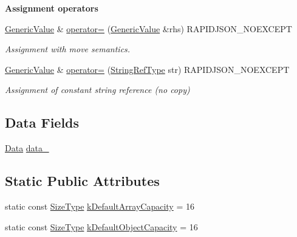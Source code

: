 \begin{Indent}\textbf{ Assignment operators}\par
\begin{DoxyCompactItemize}
\item 
\mbox{\hyperlink{classrapidjson_1_1_generic_value}{Generic\+Value}} \& \mbox{\hyperlink{classrapidjson_1_1_generic_value_ae8bcedd951f50b69786aaaa1828e9fac}{operator=}} (\mbox{\hyperlink{classrapidjson_1_1_generic_value}{Generic\+Value}} \&rhs) R\+A\+P\+I\+D\+J\+S\+O\+N\+\_\+\+N\+O\+E\+X\+C\+E\+PT
\begin{DoxyCompactList}\small\item\em Assignment with move semantics. \end{DoxyCompactList}\item 
\mbox{\hyperlink{classrapidjson_1_1_generic_value}{Generic\+Value}} \& \mbox{\hyperlink{classrapidjson_1_1_generic_value_aecc9d0a6aafe31f4fdf9f6e75e5f089c}{operator=}} (\mbox{\hyperlink{classrapidjson_1_1_generic_value_a559eb9cea54364a35518b02f6d74f379}{String\+Ref\+Type}} str) R\+A\+P\+I\+D\+J\+S\+O\+N\+\_\+\+N\+O\+E\+X\+C\+E\+PT
\begin{DoxyCompactList}\small\item\em Assignment of constant string reference (no copy) \end{DoxyCompactList}\end{DoxyCompactItemize}
\end{Indent}
\subsection*{Data Fields}
\begin{DoxyCompactItemize}
\item 
\mbox{\hyperlink{unionrapidjson_1_1_generic_value_1_1_data}{Data}} \mbox{\hyperlink{classrapidjson_1_1_generic_value_a7d1d50ccd6639e29231b3f67d94c9ecf}{data\+\_\+}}
\end{DoxyCompactItemize}
\subsection*{Static Public Attributes}
\begin{DoxyCompactItemize}
\item 
static const \mbox{\hyperlink{namespacerapidjson_a44eb33eaa523e36d466b1ced64b85c84}{Size\+Type}} \mbox{\hyperlink{classrapidjson_1_1_generic_value_ab22b5f5f153376de937e70d6be6dcadc}{k\+Default\+Array\+Capacity}} = 16
\item 
static const \mbox{\hyperlink{namespacerapidjson_a44eb33eaa523e36d466b1ced64b85c84}{Size\+Type}} \mbox{\hyperlink{classrapidjson_1_1_generic_value_ac2c66dad43986842f4a624f478de1741}{k\+Default\+Object\+Capacity}} = 16
\end{DoxyCompactItemize}
